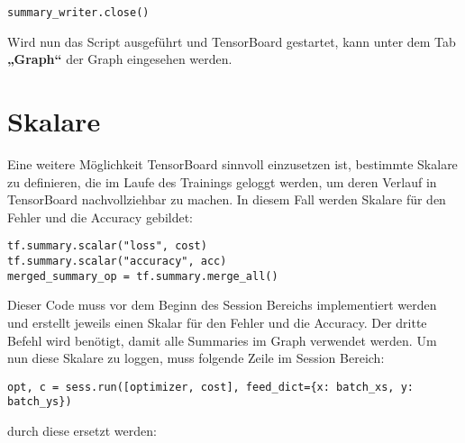 \begin{lstlisting}
summary_writer.close()
\end{lstlisting}


Wird nun das Script ausgeführt und TensorBoard gestartet, kann unter dem Tab \textbf{„Graph“} der Graph eingesehen werden.

\section{Skalare}

Eine weitere Möglichkeit TensorBoard sinnvoll einzusetzen ist, bestimmte Skalare zu definieren, die im Laufe des Trainings geloggt werden, um deren Verlauf in TensorBoard nachvollziehbar zu machen. In diesem Fall werden Skalare für den Fehler und die Accuracy gebildet:

\lstset{language=Python}

\begin{lstlisting}
tf.summary.scalar("loss", cost)
tf.summary.scalar("accuracy", acc)
merged_summary_op = tf.summary.merge_all()
\end{lstlisting}


Dieser Code muss vor dem Beginn des Session Bereichs implementiert werden und erstellt jeweils einen Skalar für den Fehler und die Accuracy. Der dritte Befehl wird benötigt, damit alle Summaries im Graph verwendet werden. Um nun diese Skalare zu loggen, muss folgende Zeile im Session Bereich:

\lstset{language=Python}

\begin{lstlisting}
opt, c = sess.run([optimizer, cost], feed_dict={x: batch_xs, y: batch_ys})
\end{lstlisting}

durch diese ersetzt werden: 

\lstset{language=Python}

